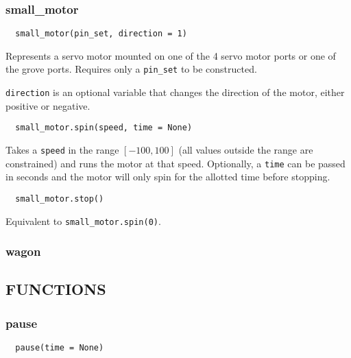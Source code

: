 \documentclass[12pt]{scrartcl} %
\begin{document}
\subsubsection{small\_motor}

\begin{verbatim}
  small_motor(pin_set, direction = 1)
\end{verbatim}

Represents a servo motor mounted on one of the 4 servo motor ports or one of
the grove ports. Requires only a \texttt{pin_set} to be
constructed.

\texttt{direction} is an optional variable that changes the
direction of the motor, either positive or negative.

\begin{verbatim}
  small_motor.spin(speed, time = None)
\end{verbatim}

Takes a \texttt{speed} in the range $[-100, 100]$ (all values
outside the range are constrained) and runs the motor at that speed.
Optionally, a \texttt{time} can be passed in seconds and the motor
will only spin for the allotted time before stopping.

\begin{verbatim}
  small_motor.stop()
\end{verbatim}

Equivalent to \texttt{small_motor.spin(0)}.

\subsubsection{wagon}

\subsection{FUNCTIONS}

\subsubsection{pause}

\begin{verbatim}
  pause(time = None)
\end{verbatim}
\end{document}
